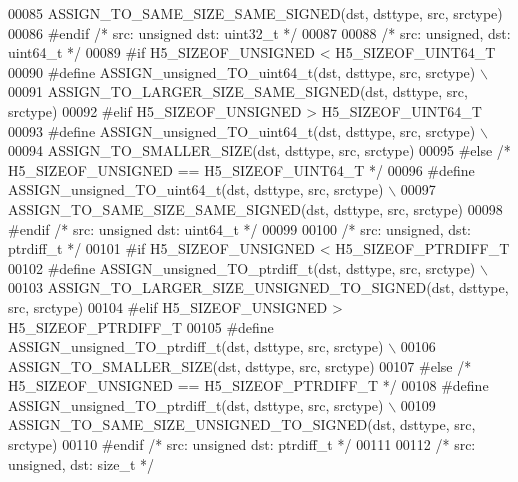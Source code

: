 \begin{DoxyCode}
00085 \textcolor{preprocessor}{        ASSIGN\_TO\_SAME\_SIZE\_SAME\_SIGNED(dst, dsttype, src, srctype)}
00086 \textcolor{preprocessor}{#endif }\textcolor{comment}{/* src: unsigned dst: uint32\_t */}\textcolor{preprocessor}{}
00087 
00088 \textcolor{comment}{/* src: unsigned, dst: uint64\_t */}
00089 \textcolor{preprocessor}{#if H5\_SIZEOF\_UNSIGNED < H5\_SIZEOF\_UINT64\_T}
00090 \textcolor{preprocessor}{    #define ASSIGN\_unsigned\_TO\_uint64\_t(dst, dsttype, src, srctype) \(\backslash\)}
00091 \textcolor{preprocessor}{        ASSIGN\_TO\_LARGER\_SIZE\_SAME\_SIGNED(dst, dsttype, src, srctype)}
00092 \textcolor{preprocessor}{#elif H5\_SIZEOF\_UNSIGNED > H5\_SIZEOF\_UINT64\_T}
00093 \textcolor{preprocessor}{    #define ASSIGN\_unsigned\_TO\_uint64\_t(dst, dsttype, src, srctype) \(\backslash\)}
00094 \textcolor{preprocessor}{        ASSIGN\_TO\_SMALLER\_SIZE(dst, dsttype, src, srctype)}
00095 \textcolor{preprocessor}{#else }\textcolor{comment}{/* H5\_SIZEOF\_UNSIGNED == H5\_SIZEOF\_UINT64\_T */}\textcolor{preprocessor}{}
00096 \textcolor{preprocessor}{    #define ASSIGN\_unsigned\_TO\_uint64\_t(dst, dsttype, src, srctype) \(\backslash\)}
00097 \textcolor{preprocessor}{        ASSIGN\_TO\_SAME\_SIZE\_SAME\_SIGNED(dst, dsttype, src, srctype)}
00098 \textcolor{preprocessor}{#endif }\textcolor{comment}{/* src: unsigned dst: uint64\_t */}\textcolor{preprocessor}{}
00099 
00100 \textcolor{comment}{/* src: unsigned, dst: ptrdiff\_t */}
00101 \textcolor{preprocessor}{#if H5\_SIZEOF\_UNSIGNED < H5\_SIZEOF\_PTRDIFF\_T}
00102 \textcolor{preprocessor}{    #define ASSIGN\_unsigned\_TO\_ptrdiff\_t(dst, dsttype, src, srctype) \(\backslash\)}
00103 \textcolor{preprocessor}{        ASSIGN\_TO\_LARGER\_SIZE\_UNSIGNED\_TO\_SIGNED(dst, dsttype, src, srctype)}
00104 \textcolor{preprocessor}{#elif H5\_SIZEOF\_UNSIGNED > H5\_SIZEOF\_PTRDIFF\_T}
00105 \textcolor{preprocessor}{    #define ASSIGN\_unsigned\_TO\_ptrdiff\_t(dst, dsttype, src, srctype) \(\backslash\)}
00106 \textcolor{preprocessor}{        ASSIGN\_TO\_SMALLER\_SIZE(dst, dsttype, src, srctype)}
00107 \textcolor{preprocessor}{#else }\textcolor{comment}{/* H5\_SIZEOF\_UNSIGNED == H5\_SIZEOF\_PTRDIFF\_T */}\textcolor{preprocessor}{}
00108 \textcolor{preprocessor}{    #define ASSIGN\_unsigned\_TO\_ptrdiff\_t(dst, dsttype, src, srctype) \(\backslash\)}
00109 \textcolor{preprocessor}{        ASSIGN\_TO\_SAME\_SIZE\_UNSIGNED\_TO\_SIGNED(dst, dsttype, src, srctype)}
00110 \textcolor{preprocessor}{#endif }\textcolor{comment}{/* src: unsigned dst: ptrdiff\_t */}\textcolor{preprocessor}{}
00111 
00112 \textcolor{comment}{/* src: unsigned, dst: size\_t */}

\end{DoxyCode}
